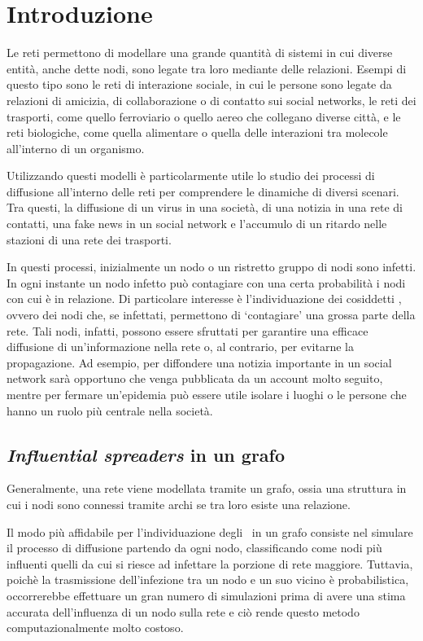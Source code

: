 \chapter{Introduzione}

Le reti permettono di modellare una grande quantità di sistemi in cui diverse entità,
anche dette nodi, sono legate tra loro mediante delle relazioni.
Esempi di questo tipo sono le reti di interazione sociale, in cui le persone sono legate 
da relazioni di amicizia, di collaborazione o di contatto sui social networks, 
le reti dei trasporti, come quello ferroviario o quello aereo
che collegano diverse città, e le reti biologiche, come quella alimentare o
quella delle interazioni tra molecole all'interno di un organismo.

Utilizzando questi modelli è particolarmente utile lo studio dei processi di diffusione
all'interno delle reti per comprendere le dinamiche di diversi scenari.
Tra questi, la diffusione di un virus in una società, di una notizia in una rete di contatti, 
una fake news in un social network e l'accumulo di un ritardo nelle stazioni di una rete 
dei trasporti.

In questi processi, inizialmente un nodo o un ristretto gruppo di nodi sono infetti. In
ogni instante un nodo infetto può contagiare con una certa probabilità i nodi con cui 
è in relazione.
Di particolare interesse è l'individuazione dei cosiddetti \infsp, ovvero dei nodi
che, se infettati, permettono di `contagiare' una grossa parte della rete.
Tali nodi, infatti, possono essere sfruttati per garantire una efficace diffusione 
di un'informazione nella rete o, al contrario, per evitarne la propagazione.
Ad esempio, per diffondere una notizia importante in un social network sarà opportuno che 
venga pubblicata da un account molto seguito, mentre per fermare un'epidemia 
può essere utile isolare i luoghi o le persone che hanno un ruolo più centrale
nella società.


\section{\textit{Influential spreaders} in un grafo}

Generalmente, una rete viene modellata tramite un grafo, ossia una struttura in cui i 
nodi sono connessi tramite archi se tra loro esiste una relazione.

Il modo più affidabile per l'individuazione degli \infsp\ in un grafo consiste nel 
simulare il processo di diffusione partendo da ogni nodo, classificando come nodi più 
influenti quelli da cui si riesce ad infettare la porzione di rete maggiore.
Tuttavia, poichè la trasmissione dell'infezione tra un nodo e un suo vicino è probabilistica,
occorrerebbe effettuare un gran numero di simulazioni prima di avere una stima accurata 
dell'influenza di un nodo sulla rete e ciò rende questo metodo computazionalmente 
molto costoso.

